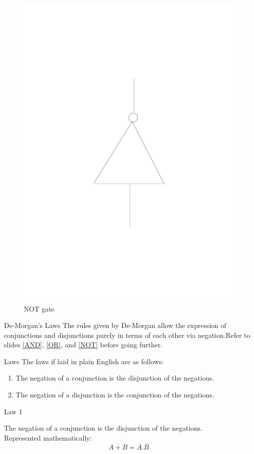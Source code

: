 \documentclass{beamer}
\begin{document}
\begin{frame}
\begin{figure}
\includegraphics[scale=0.2]{../beamer_bib/not.pdf} 
\caption{NOT gate}
\end{figure}
\end{frame}
\begin{frame}{De-Morgan's Laws}
The rules given by De-Morgan allow the expression of conjunctions and disjunctions purely in terms of each other via negation.Refer to slides \ref{AND}, \ref{OR}, and \ref{NOT} before going further.
\pause
\begin{block}{Laws}
The laws if laid in plain English are as follows:
\begin{enumerate}
\item The negation of a conjunction is the disjunction of the negations.
\item The negation of a disjunction is the conjunction of the negations.
\end{enumerate}
\end{block}
\end{frame}
\begin{frame}{Law 1}
\begin{theorem}
The negation of a conjunction is the disjunction of the negations.\\
Represented mathematically:
\begin{equation}
\overline{A+B}=\overline{A}.\overline{B}
\end{equation}
\end{theorem}
\end{frame}
\end{document}

